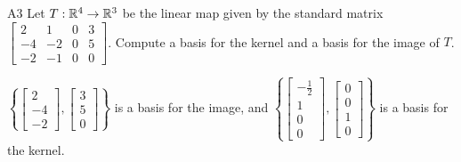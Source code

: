 \begin{problem}{A3}
Let $T: \mathbb{R}^4 \rightarrow \mathbb{R}^3$ be the linear map given by the standard matrix
\(
  \begin{bmatrix}
    2 & 1 & 0 & 3 \\
    -4 & -2 & 0 & 5 \\
    -2 & -1 & 0 & 0
  \end{bmatrix}
\). Compute a basis for the kernel and a basis for the image of $T$.
\end{problem}
\begin{solution}
\(\left\{
\begin{bmatrix}
  2 \\ -4 \\ -2
\end{bmatrix},
\begin{bmatrix}
  3 \\ 5 \\ 0
\end{bmatrix}
\right\} \) is a basis for the image, and \(\left\{
  \begin{bmatrix} -\frac{1}{2} \\ 1 \\ 0 \\ 0\end{bmatrix},
  \begin{bmatrix} 0 \\ 0 \\ 1 \\ 0\end{bmatrix}
\right\} \) is a basis for the kernel.
\end{solution}
